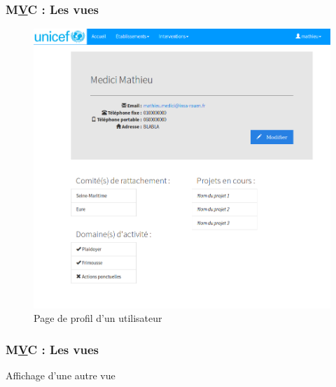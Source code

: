 \begin{frame}
\frametitle{M\underline{V}C : Les vues}
\begin{figure}[!h]
	\begin{center}
	\includegraphics[scale=0.165]{images/profil.png}
	\caption{Page de profil d'un utilisateur}
	\end{center}
\end{figure}
\end{frame}

\begin{frame}
\frametitle{M\underline{V}C : Les vues}
Affichage d'une autre vue
\end{frame}